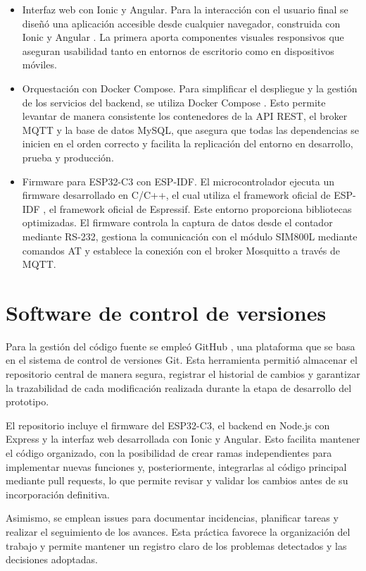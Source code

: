 \begin{itemize}
\item Interfaz web con Ionic y Angular.
Para la interacción con el usuario final se diseñó una aplicación accesible desde cualquier navegador, construida con Ionic \cite{ionic} y Angular \cite{angular}. La primera aporta componentes visuales responsivos que aseguran usabilidad tanto en entornos de escritorio como en dispositivos móviles.

\item Orquestación con Docker Compose.
Para simplificar el despliegue y la gestión de los servicios del backend, se utiliza Docker Compose \cite{docker_compose}. Esto permite levantar de manera consistente los contenedores de la API REST, el broker MQTT y la base de datos MySQL, que asegura que todas las dependencias se inicien en el orden correcto y facilita la replicación del entorno en desarrollo, prueba y producción.

\item  Firmware para ESP32-C3 con ESP-IDF.
El microcontrolador ejecuta un firmware desarrollado en C/C++, el cual utiliza el framework oficial de ESP-IDF \cite{espidf}, el framework oficial de Espressif. Este entorno proporciona bibliotecas optimizadas. El firmware controla la captura de datos desde el contador mediante RS-232, gestiona la comunicación con el módulo SIM800L mediante comandos AT y establece la conexión con el broker Mosquitto a través de MQTT.

\end{itemize}


\section{Software de control de versiones}
Para la gestión del código fuente se empleó GitHub \cite{github}, una plataforma que se basa en el sistema de control de versiones Git. Esta herramienta permitió almacenar el repositorio central de manera segura, registrar el historial de cambios y garantizar la trazabilidad de cada modificación realizada durante la etapa de desarrollo del prototipo.

El repositorio incluye el firmware del ESP32-C3, el backend en Node.js con Express y la interfaz web desarrollada con Ionic y Angular. Esto facilita mantener el código organizado, con la posibilidad de crear ramas independientes para implementar nuevas funciones y, posteriormente, integrarlas al código principal mediante pull requests, lo que permite revisar y validar los cambios antes de su incorporación definitiva.

Asimismo, se emplean issues para documentar incidencias, planificar tareas y realizar el seguimiento de los avances. Esta práctica favorece la organización del trabajo y permite mantener un registro claro de los problemas detectados y las decisiones adoptadas.


